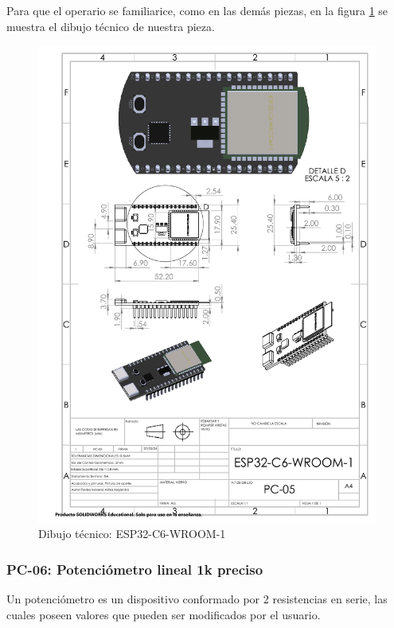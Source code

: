 Para que el operario se familiarice, como en las demás piezas, en la figura \ref{fig:esp} se muestra el dibujo técnico de nuestra pieza.
\begin{figure}[H]
    \centering
    \includegraphics[trim = {7mm 1mm 1mm 1mm},clip,scale=0.4]{22/img/esp32Dibujo.pdf}
    \caption{Dibujo técnico: ESP32-C6-WROOM-1}
    \label{fig:esp}
\end{figure}

\subsubsection{PC-06: Potenciómetro lineal 1k preciso }
Un potenciómetro es un dispositivo conformado por 2 resistencias en serie, las cuales poseen valores que pueden ser modificados por el usuario. 


